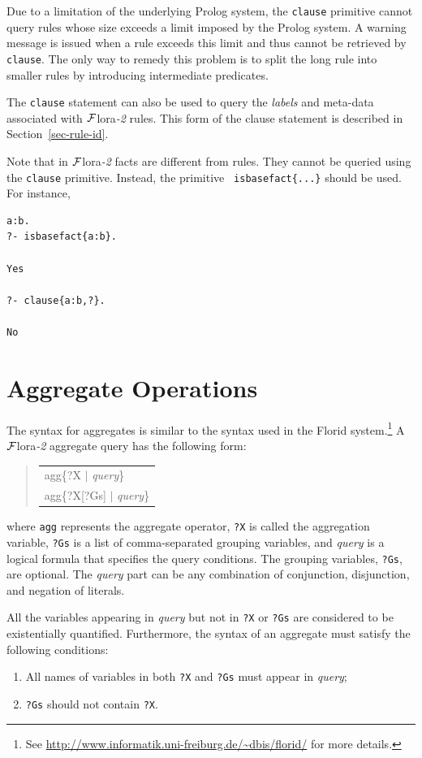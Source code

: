 \documentclass[11pt]{article}
\newcommand{\FLSYSTEM}{{\mbox{\sc ${\cal F}${lora}\rm\emph{-2}}}\xspace}
\newenvironment{qrules}{\begin{quote}\tt\begin{tabular}[t]{l}}%
{\end{tabular}\end{quote}}
\newcommand{\FLORID}{{\mbox{\sc Florid}}\xspace}
\begin{document}
Due to a limitation of the underlying Prolog system, the {\tt clause}
primitive cannot query rules whose size exceeds a limit imposed by the
Prolog system.  A warning message is issued when a rule exceeds this limit
and thus cannot be retrieved by {\tt clause}.  The only way to remedy this
problem is to split the long rule into smaller rules by introducing
intermediate predicates.

The {\tt clause} statement can also be used to query the \emph{labels} and
meta-data associated with \FLSYSTEM rules. This form of the clause statement
is described in Section~\ref{sec-rule-id}.

Note that in \FLSYSTEM facts are different from rules. They cannot be queried
using the {\tt clause} primitive. Instead, the primitive {\tt
  isbasefact\{...\}} should be used. For instance,
\begin{verbatim}
a:b.
?- isbasefact{a:b}.

Yes

?- clause{a:b,?}.

No
\end{verbatim}


\section{Aggregate Operations}
\label{sec-aggregates}


The syntax for aggregates is similar to the syntax used in the \FLORID
system.\footnote{
  See \url{http://www.informatik.uni-freiburg.de/~dbis/florid/} for more
  details.
}
A \FLSYSTEM aggregate query has the following form:
\begin{qrules}
agg\{?X $|$ {\it query}\}\\
agg\{?X[?Gs] $|$ {\it query}\}
\end{qrules}
%
where {\tt agg} represents the aggregate operator, {\tt ?X} is called the
aggregation variable, {\tt ?Gs} is a list of comma-separated grouping
variables, and {\it query} is a logical formula that specifies the
query conditions. The grouping variables, {\tt ?Gs}, are optional. The {\it
query} part
can be any combination of conjunction, disjunction, and negation of literals.

All the variables appearing in {\it query} but not in {\tt ?X} or {\tt ?Gs} are
considered to be existentially quantified. Furthermore, the syntax of an
aggregate must satisfy the following conditions:
\begin{enumerate}
\item All names of variables in both {\tt ?X} and {\tt ?Gs} must
appear in {\it query};
\item {\tt ?Gs} should not contain {\tt ?X}.
\end{enumerate}
\end{document}
